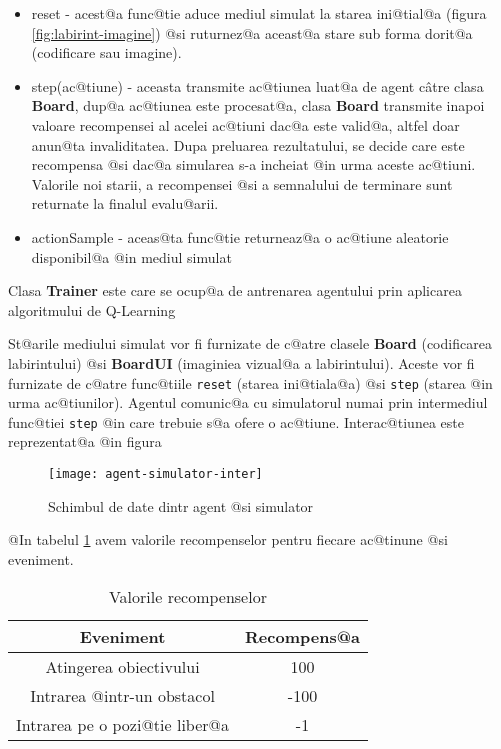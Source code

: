 \begin{itemize}
	\item reset - acest@a func@tie aduce mediul simulat la starea ini@tial@a (figura \ref{fig:labirint-imagine}) @si ruturnez@a aceast@a stare sub forma dorit@a (codificare sau imagine).
	\item step(ac@tiune) - aceasta transmite ac@tiunea luat@a de agent c\^ atre clasa \textbf{Board}, dup@a ac@tiunea este procesat@a, clasa \textbf{Board} transmite inapoi valoare recompensei al acelei ac@tiuni dac@a este valid@a, altfel doar anun@ta invaliditatea. Dupa preluarea rezultatului, se decide care este recompensa @si dac@a simularea s-a incheiat @in urma aceste ac@tiuni. Valorile noi starii, a recompensei @si a semnalului de terminare sunt returnate la finalul evalu@arii.
	\item actionSample - aceas@ta func@tie returneaz@a o ac@tiune aleatorie disponibil@a @in mediul simulat
\end{itemize}

Clasa \textbf{Trainer} este care se ocup@a de antrenarea agentului prin aplicarea algoritmului de Q-Learning


St@arile mediului simulat vor fi furnizate de c@atre clasele \textbf{Board} (codificarea labirintului) @si \textbf{BoardUI} (imaginiea vizual@a a labirintului). Aceste vor fi furnizate de c@atre func@tiile \texttt{reset} (starea ini@tiala@a) @si \texttt{step} (starea @in urma ac@tiunilor). Agentul comunic@a cu simulatorul numai prin intermediul func@tiei \texttt{step} @in care trebuie s@a ofere o ac@tiune. Interac@tiunea este reprezentat@a @in figura 

\begin{figure}[h!]
	\centering
	\texttt{[image: agent-simulator-inter]}
	\caption{Schimbul de date dintr agent @si simulator}
	\label{fig:agent-simulator-inter}
\end{figure}

@In tabelul \ref{fig:tabel-recompense} avem valorile recompenselor pentru fiecare ac@tinune @si eveniment.

\begin{table}[H]
	\begin{center}
		\begin{tabular}{|c|c|} 
			\hline
			Eveniment & Recompens@a \\
			\hline
			Atingerea obiectivului & 100 \\
			\hline
			Intrarea @intr-un obstacol & -100 \\
			\hline
			Intrarea pe o pozi@tie liber@a & -1 \\
			\hline
		\end{tabular}
	\end{center}
	\caption{Valorile recompenselor}
	\label{fig:tabel-recompense}
\end{table}


